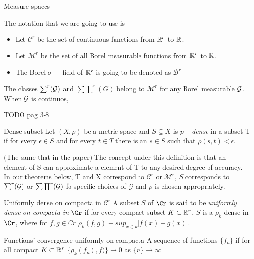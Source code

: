\begin{definition} Measure spaces \cite{rudin-lebesgue-theory}

     
\end{definition}


The notation that we are going to use is

\begin{definition}
    \begin{itemize}
        \item Let $\mathcal C^r$ be the set of continuous functions from $\mathbb{R}^r$ to $\mathbb{R}$.
        \item Let $\mathcal{M}^r$ be the set of all Borel measurable functions from $\mathbb{R}^r$ to $\mathbb{R}$.
        \item The Borel $\sigma -$ field of $\mathbb{R}^r$ is going to be denoted as $\mathcal B^r$
    \end{itemize}
\end{definition}  

The classes $\sum ^r (\mathcal{G})$ and $\sum \prod ^r (G)$ belong to $\mathcal{M}^r$ 
for any Borel measurable $\mathcal{G}$. When $\mathcal{G}$ is continuos, 

TODO pag 3-8  

\begin{definition} Dense subset  
    Let $(X,\rho)$ be a metric space and $S \subseteq X$ is $p-$\textit{dense} in a subset T
    if for every $\epsilon \in S$ and for every $t \in T$ 
    there is an $s \in S$ such that $\rho (s, t) < \epsilon$. 
\end{definition}  

(The same that in the paper)
The concept under this definition is that an element of S can approximate a element of T to any desired degree of 
accuracy. In our theorems below, T and X correspond to $\mathcal{C}^r$ or $\mathcal{M}^r$, $S$ corresponds to 
$\sum ^r (\mathcal{G})$ or $\sum \prod ^r ( \mathcal{G})$ fo specific choices of $\mathcal G$ and $\rho$ is chosen appropriately.



\begin{definition} Uniformly dense on compacta in $\mathcal{C} ^r$
    A subset $S$ of $\Cr$ is said to be \textit{uniformly dense on compacta in } $\Cr$ if for every compact subset
    $K \subset \mathbb{R}^r$, $S$ is a $\rho_k$-dense in $\Cr$, where for $f,g \in Cr$ 
    $\rho_k(f,g) \equiv sup_{x\in k} |f(x) - g(x)|$. 
\end{definition}

\begin{definition} Functions' convergence uniformly on compacta
    A sequence of functions  $\{f_n\}$  if for all
    compact $K \subset \mathbb{R} ^r$  $\{ \rho_k(f_n), f) \} \rightarrow 0$ as $\{n \} \rightarrow \infty$
\end{definition}



